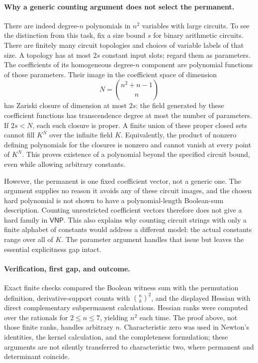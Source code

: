 \documentclass[11pt]{article}
\begin{document}
\paragraph{Why a generic counting argument does not select the permanent.}
There are indeed degree-$n$ polynomials in $n^2$ variables with large
circuits. To see the distinction from this task, fix a size bound $s$
for binary arithmetic circuits. There are finitely many circuit
topologies and choices of variable labels of that size. A topology
has at most $2s$ constant input slots; regard them as parameters.
The coefficients of its homogeneous degree-$n$ component are
polynomial functions of those parameters. Their image in the
coefficient space of dimension
\[
 N=\binom{n^2+n-1}{n}
\]
has Zariski closure of dimension at most $2s$: the field generated
by these coefficient functions has transcendence degree at most the
number of parameters. If $2s<N$, each such closure is proper.
A finite union of these proper closed sets cannot fill $K^N$ over
the infinite field $K$. Equivalently, the product of nonzero defining
polynomials for the closures is nonzero and cannot vanish at every
point of $K^N$. This proves existence of a polynomial beyond the
specified circuit bound, even while allowing arbitrary constants.

However, the permanent is one fixed coefficient vector, not a generic
one. The argument supplies no reason it avoids any of these circuit
images, and the chosen hard polynomial is not shown to have a
polynomial-length Boolean-sum description. Counting unrestricted
coefficient vectors therefore does not give a hard family in
$\mathsf{VNP}$. This also explains why counting circuit strings with
only a finite alphabet of constants would address a different model:
the actual constants range over all of $K$. The parameter argument
handles that issue but leaves the essential explicitness gap intact.

\paragraph{Verification, first gap, and outcome.}
Exact finite checks compared the Boolean witness sum with the
permutation definition, derivative-support counts with
$\binom nk^2$, and the displayed Hessian with direct complementary
subpermanent calculations. Hessian ranks were computed over the
rationals for $2\le n\le7$, yielding $n^2$ each time. The proof above,
not those finite ranks, handles arbitrary $n$. Characteristic zero
was used in Newton's identities, the kernel calculation, and the
completeness formulation; these arguments are not silently transferred
to characteristic two, where permanent and determinant coincide.
\end{document}
